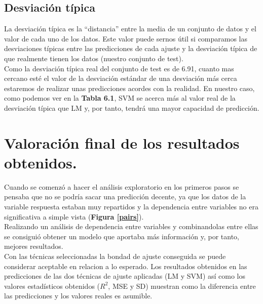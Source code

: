 \subsection{Desviación típica}

	La desviación típica es la ``distancia'' entre la media de un conjunto de datos y el valor de cada uno de los datos. Este valor puede sernos útil si comparamos las desviaciones típicas entre las predicciones de cada ajuste y la desviación típica de que realmente tienen los datos (nuestro conjunto de test).\\	
	
	Como la desviación típica real del conjunto de test es de 6.91, cuanto mas cercano esté el valor de la desviación estándar de una desviación más cerca estaremos de realizar unas predicciones acordes con la realidad. En nuestro caso, como podemos ver en la \textbf{Tabla 6.1}, SVM se acerca más al valor real de la desviación típica que LM y, por tanto, tendrá una mayor capacidad de predicción.



\section{Valoración final de los resultados obtenidos.}

Cuando se comenzó a hacer el análisis exploratorio en los primeros pasos se pensaba que no se podría sacar una predicción decente, ya que los datos de la variable respuesta estaban muy repartidos y la dependencia entre variables no era significativa a simple vista (\textbf{Figura \ref{pairs}}).\\

Realizando un análisis de dependencia entre variables y combinandolas entre ellas se consiguió obtener un modelo que aportaba más información y, por tanto, mejores resultados.\\

Con las técnicas seleccionadas la bondad de ajuste conseguida se puede considerar aceptable en relacion a lo esperado. Los resultados obtenidos en las predicciones de las dos técnicas de ajuste aplicadas (LM y SVM) así como los valores estadísticos obtenidos ($R^{2}$, MSE y SD) muestran como la diferencia entre las predicciones y los valores reales es asumible.

